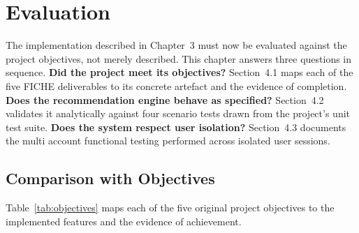 
\chapter{Evaluation}

The implementation described in Chapter~3 must now be evaluated against the project objectives, not merely described. This chapter answers three questions in sequence. \textbf{Did the project meet its objectives?} Section~4.1 maps each of the five FICHE deliverables to its concrete artefact and the evidence of completion. \textbf{Does the recommendation engine behave as specified?} Section~4.2 validates it analytically against four scenario tests drawn from the project's unit test suite. \textbf{Does the system respect user isolation?} Section~4.3 documents the multi account functional testing performed across isolated user sessions.

\section{Comparison with Objectives}

Table~\ref{tab:objectives} maps each of the five original project objectives to the implemented features and the evidence of achievement.

